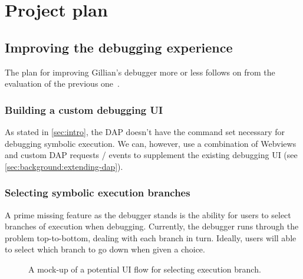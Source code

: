\chapter{Project plan}
\label{cha:plan}

\section{Improving the debugging experience}

The plan for improving Gillian's debugger more or less follows on from the evaluation of the previous one~\cite{gillian-debugging-2021}.

\subsection{Building a custom debugging UI}

As stated in \autoref{sec:intro}, the DAP doesn't have the command
set necessary for debugging symbolic execution. We can, however, use a
combination of Webviews and custom DAP requests / events to supplement the
existing debugging UI (see \autoref{sec:background:extending-dap}).

\subsection{Selecting symbolic execution branches}

A prime missing feature as the debugger stands is the ability for users to
select branches of execution when debugging. Currently, the debugger runs
through the problem top-to-bottom, dealing with each branch in turn. Ideally,
users will able to select which branch to go down when given a choice.

\begin{figure}
  \noindent
  \caption{A mock-up of a potential UI flow for selecting execution branch.}
  \label{fig:branch-selection-mockup}
\end{figure}

